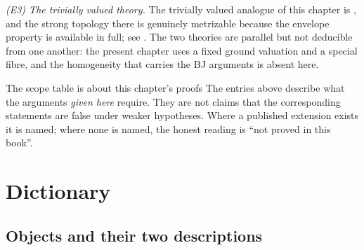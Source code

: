 \emph{(E3) The trivially valued theory.}  The trivially valued analogue of
this chapter is , and the strong
topology there is genuinely metrizable because the envelope property is
available in full; see .  The two theories are
parallel but not deducible from one another: the present chapter uses a fixed
ground valuation and a special fibre, and the homogeneity that carries the BJ
arguments is absent here.

\begin{warning}{The scope table is about this chapter's proofs}
The entries above describe what the arguments \emph{given here} require.
They are not claims that the corresponding statements are false under weaker
hypotheses.  Where a published extension exists it is named; where none is
named, the honest reading is ``not proved in this book''.
\end{warning}

\section{Dictionary}
\label{sec:ch26-dictionary}

\subsection{Objects and their two descriptions}
\label{sec:ch26-dict-objects}


